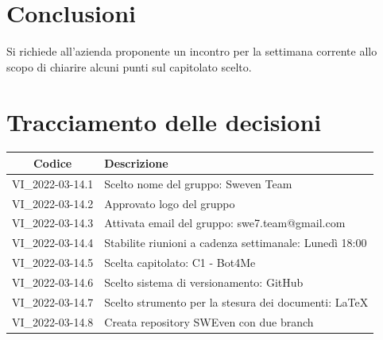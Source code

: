 \documentclass[12pt, a4paper,table]{article}
\begin{document}
	\section{Conclusioni}
	Si richiede all'azienda proponente un incontro per la settimana corrente allo scopo di chiarire alcuni punti sul capitolato scelto.
	\newpage
	\section*{Tracciamento delle decisioni}
	\begin{tabular}{ |c|l| }
		\hline
		\textbf{Codice} & \textbf{Descrizione} \\
		\hline
		VI\_2022-03-14.1 & Scelto nome del gruppo: Sweven Team \\ \hline
		VI\_2022-03-14.2 & Approvato logo del gruppo\\ \hline
		VI\_2022-03-14.3 & Attivata email del gruppo: swe7.team@gmail.com\\ \hline
		VI\_2022-03-14.4 & Stabilite riunioni a cadenza settimanale: Lunedì 18:00\\ \hline
        VI\_2022-03-14.5 & Scelta capitolato: C1 - Bot4Me\\ \hline
		VI\_2022-03-14.6 & Scelto sistema di versionamento: GitHub\\ \hline
		VI\_2022-03-14.7 & Scelto strumento per la stesura dei documenti: \LaTeX\\ \hline
        VI\_2022-03-14.8 & Creata repository SWEven con due branch\\
		\hline
	\end{tabular}
\end{document}
